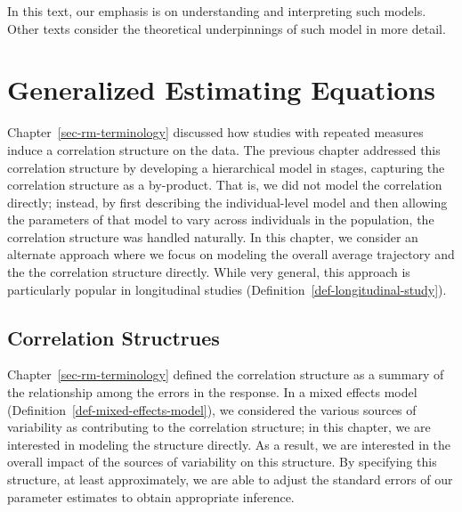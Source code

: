 \documentclass[
  letterpaper,
  DIV=11,
  numbers=noendperiod]{scrreprt}
\theoremstyle{definition}
\theoremstyle{definition}
\theoremstyle{remark}
\begin{document}
In this text, our emphasis is on understanding and interpreting such
models. Other texts consider the theoretical underpinnings of such model
in more detail.

\hypertarget{sec-rm-gee}{%
\chapter{Generalized Estimating Equations}\label{sec-rm-gee}}

\providecommand{\norm}[1]{\lVert#1\rVert}
\providecommand{\abs}[1]{\lvert#1\rvert}
\providecommand{\dist}[1]{\stackrel{\text{#1}}{\sim}}
\providecommand{\ind}[1]{\mathbb{I}\left(#1\right)}
\providecommand{\bm}[1]{\mathbf{#1}}
\providecommand{\bs}[1]{\boldsymbol{#1}}
\providecommand{\Ell}{\mathcal{L}}
\providecommand{\indep}{\perp\negthickspace\negmedspace\perp}

Chapter~\ref{sec-rm-terminology} discussed how studies with repeated
measures induce a correlation structure on the data. The previous
chapter addressed this correlation structure by developing a
hierarchical model in stages, capturing the correlation structure as a
by-product. That is, we did not model the correlation directly; instead,
by first describing the individual-level model and then allowing the
parameters of that model to vary across individuals in the population,
the correlation structure was handled naturally. In this chapter, we
consider an alternate approach where we focus on modeling the overall
average trajectory and the the correlation structure directly. While
very general, this approach is particularly popular in longitudinal
studies (Definition~\ref{def-longitudinal-study}).

\hypertarget{correlation-structrues}{%
\section{Correlation Structrues}\label{correlation-structrues}}

Chapter~\ref{sec-rm-terminology} defined the correlation structure as a
summary of the relationship among the errors in the response. In a mixed
effects model (Definition~\ref{def-mixed-effects-model}), we considered
the various sources of variability as contributing to the correlation
structure; in this chapter, we are interested in modeling the structure
directly. As a result, we are interested in the overall impact of the
sources of variability on this structure. By specifying this structure,
at least approximately, we are able to adjust the standard errors of our
parameter estimates to obtain appropriate inference.
\end{document}
